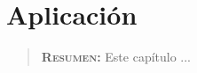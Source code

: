 \chapter{Aplicación}
\label{ch:aplicacion}

\begin{quote}
	{\bf\textsc{Resumen:}} Este capítulo ...
\end{quote}











